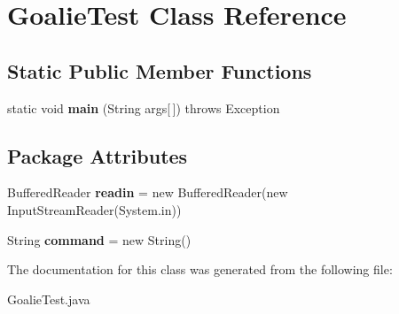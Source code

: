 \hypertarget{classGoalieTest}{
\section{GoalieTest Class Reference}
\label{classGoalieTest}
}
\subsection*{Static Public Member Functions}
\begin{DoxyCompactItemize}
\item 
\hypertarget{classGoalieTest_ab7125551251083232c6ffe8b44af22b1}{
static void {\bfseries main} (String args\mbox{[}$\,$\mbox{]})  throws Exception 	}
\label{classGoalieTest_ab7125551251083232c6ffe8b44af22b1}

\end{DoxyCompactItemize}
\subsection*{Package Attributes}
\begin{DoxyCompactItemize}
\item 
\hypertarget{classGoalieTest_ad36eb0f6b2332e795869fb8e0188dc28}{
BufferedReader {\bfseries readin} = new BufferedReader(new InputStreamReader(System.in))}
\label{classGoalieTest_ad36eb0f6b2332e795869fb8e0188dc28}

\item 
\hypertarget{classGoalieTest_a1f79e80350e2e94f5a2c5f847c6b9a13}{
String {\bfseries command} = new String()}
\label{classGoalieTest_a1f79e80350e2e94f5a2c5f847c6b9a13}

\end{DoxyCompactItemize}


The documentation for this class was generated from the following file:\begin{DoxyCompactItemize}
\item 
GoalieTest.java\end{DoxyCompactItemize}
